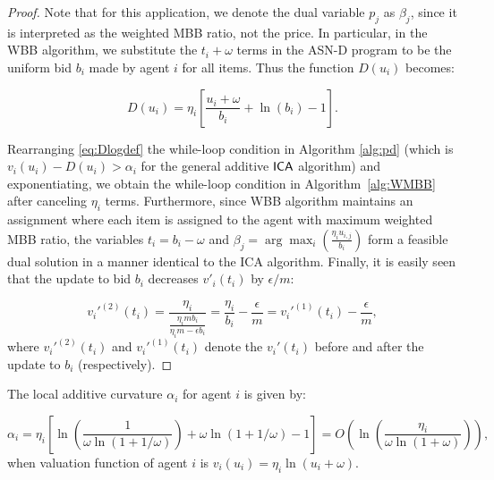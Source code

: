 \begin{proof}


Note that for this application, we denote the dual variable $p_j$ as $\beta_j$, since it is interpreted as the weighted MBB ratio, not the price. In particular, in the WBB algorithm, we substitute the $t_i + \omega$ terms in the {\sc ASN-D} program to be the uniform bid $b_i$ made by agent $i$ for all items. Thus the function $D(u_i)$ becomes: 

\begin{equation} 
\label{eq:Dlogdef}
D(u_i) = \eta_i\left[\frac{u_i + \omega}{b_i} + \ln(b_i)  -1 \right].
\end{equation}

Rearranging \eqref{eq:Dlogdef} the while-loop condition in Algorithm \ref{alg:pd} (which is $v_i(u_i) - D(u_i) > \alpha_i$ for the general additive $\mathsf{ICA}$ algorithm) and  exponentiating, we obtain the while-loop condition in Algorithm~\ref{alg:WMBB} after canceling $\eta_i$ terms. Furthermore, since WBB algorithm maintains an assignment where each item is assigned to the agent with maximum weighted MBB ratio, the variables $t_i = b_i - \omega$ and $\beta_j = \arg\max_{i} \left( \frac{ \eta_i u_{i,j}}{b_i} \right)$ form a feasible dual solution in a manner identical to the ICA algorithm. 
Finally, it is easily seen that the update to bid $b_i$ decreases $v'_i(t_i)$ by $\epsilon/m$:


\begin{equation*}
v_i'^{(2)}(t_i) = \frac{\eta_i}{\frac{\eta_imb_i}{\eta_i m - \epsilon b_i}} = \frac{\eta_i}{b_i} - \frac{\epsilon}{m} = v_i'^{(1)}(t_i) - \frac{\epsilon}{m},
\end{equation*}
where $v_i'^{(2)}(t_i)$ and $v_i'^{(1)}(t_i)$ denote the $v_i'(t_i)$ before and after the update to $b_i$ (respectively). 
\end{proof}


\begin{lemma}
\label{lem:nsw-diff-gap}
The local additive curvature $\alpha_i$ for agent $i$ is given by:

\begin{equation*} 
\alpha_i = \eta_i  \left[ \ln\left(\frac{1}{\omega \ln(1+1/\omega)}\right) + \omega \ln(1+1/\omega) - 1 \right]= O\left(\ln\left(\frac{\eta_i}{\omega\ln(1+\omega)}\right)\right),
\end{equation*}
when valuation function of agent $i$ is $v_i(u_i) = \eta_i \ln(u_i + \omega)$.
\end{lemma}

